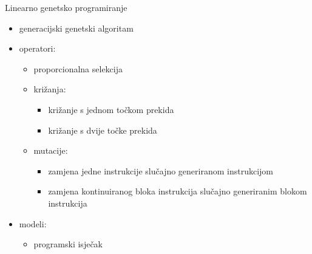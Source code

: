 \begin{frame}{Linearno genetsko programiranje}
	\begin{itemize}
		\item generacijski genetski algoritam
		\item operatori:
		\begin{itemize}
			\item proporcionalna selekcija
			\item križanja:
			\begin{itemize}
				\item križanje s jednom točkom prekida
				\item križanje s dvije točke prekida
			\end{itemize}
			\item mutacije:
			\begin{itemize}
				\item zamjena jedne instrukcije slučajno generiranom instrukcijom
				\item zamjena kontinuiranog bloka instrukcija slučajno generiranim blokom instrukcija
			\end{itemize}
		\end{itemize}
		\item modeli:
		\begin{itemize}
			\item programski isječak
		\end{itemize}
	\end{itemize}
\end{frame}
